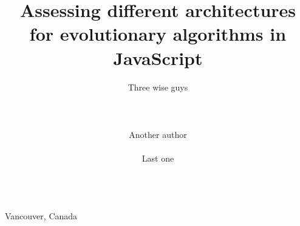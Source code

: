 \documentclass{sig-alternate}
\begin{document}
%
 {Vancouver, Canada}

\title{Assessing different architectures for evolutionary algorithms in JavaScript}
\subtitle{}

\author{
\alignauthor
Three wise guys\\
       \\
       \\
       \\
\alignauthor
Another author\\
\\
\alignauthor
Last one\\
\\
}
\end{document}
